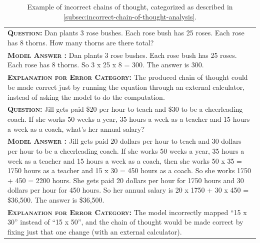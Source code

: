 \documentclass[]{article}
\newcommand{\xmark}{\ding{55}}%
\theoremstyle{plain}
\theoremstyle{definition}
\theoremstyle{remark}
\begin{document}
\begingroup
\begin{table}[h]
    \caption{
    Example of incorrect chains of thought, categorized as described in \cref{subsec:incorrect-chain-of-thought-analysis}.
    }
    \centering
    \small
    \begin{tabular}{p{\linewidth}}
        \toprule
        \vspace{-2mm}
        \textbf{\textsc{Question:}} Dan plants 3 rose bushes. Each rose bush has 25 roses. Each rose has 8 thorns. How many thorns are there total? \\
        \vspace{-1mm}
        \textbf{\textsc{Model Answer \color{blue}{(incorrect; calculator error only)}:}} Dan plants 3 rose bushes. Each rose bush has 25 roses. Each rose has 8 thorns. So {\color{blue}3 x 25 x 8 = 300}. The answer is 300. \color{blue}{\xmark} \\
        \vspace{-1mm}
        \textbf{\textsc{Explanation for Error Category:}} The produced chain of thought could be made correct just by running the equation through an external calculator, instead of asking the model to do the computation. \\
        \midrule
        \vspace{-2mm}
        \textbf{\textsc{Question:}} Jill gets paid \$20 per hour to teach and \$30 to be a cheerleading coach. If she works 50 weeks a year, 35 hours a week as a teacher and 15 hours a week as a coach, what's her annual salary? \\
        \vspace{-1mm}
        \textbf{\textsc{Model Answer \color{blue}{(incorrect; symbol mapping error)}:}} Jill gets paid 20 dollars per hour to teach and 30 dollars per hour to be a cheerleading coach. If she works 50 weeks a year, 35 hours a week as a teacher and 15 hours a week as a coach, then she works 50 x 35 = 1750 hours as a teacher and {\color{blue}15 x 30} = 450 hours as a coach. So she works 1750 + 450 = 2200 hours. She gets paid 20 dollars per hour for 1750 hours and 30 dollars per hour for 450 hours. So her annual salary is 20 x 1750 + 30 x 450 = \$36,500. The answer is \$36,500.   \color{blue}{\xmark} \\
        \vspace{-1mm}
        \textbf{\textsc{Explanation for Error Category:}} The model incorrectly mapped ``15 x 30'' instead of ``15 x 50'', and the chain of thought would be made correct by fixing just that one change (with an external calculator). \\

\end{tabular}
\end{table}
\end{document}
